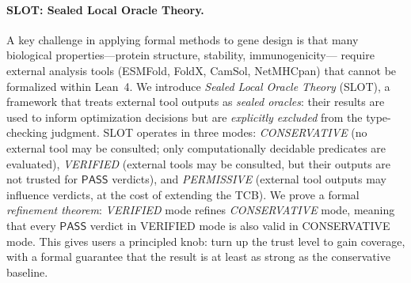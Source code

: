 \documentclass[acmsmall,review,anonymous]{acmart}
\newcommand{\PASS}{\ensuremath{\mathsf{PASS}}\xspace}
\begin{document}
\paragraph{SLOT: Sealed Local Oracle Theory.}
A key challenge in applying formal methods to gene design is that many
biological properties---protein structure, stability, immunogenicity---
require external analysis tools (ESMFold, FoldX, CamSol, NetMHCpan)
that cannot be formalized within Lean~4.
We introduce \emph{Sealed Local Oracle Theory} (SLOT), a framework
that treats external tool outputs as \emph{sealed oracles}: their
results are used to inform optimization decisions but are
\emph{explicitly excluded} from the type-checking judgment.
SLOT operates in three modes:
\emph{CONSERVATIVE} (no external tool may be consulted; only
computationally decidable predicates are evaluated),
\emph{VERIFIED} (external tools may be consulted, but their outputs
are not trusted for \PASS{} verdicts), and
\emph{PERMISSIVE} (external tool outputs may influence verdicts, at
the cost of extending the TCB).
We prove a formal \emph{refinement theorem}:
\emph{VERIFIED} mode refines \emph{CONSERVATIVE} mode, meaning that
every \PASS{} verdict in VERIFIED mode is also valid in CONSERVATIVE
mode.
This gives users a principled knob: turn up the trust level to gain
coverage, with a formal guarantee that the result is at least as strong
as the conservative baseline.
\end{document}
